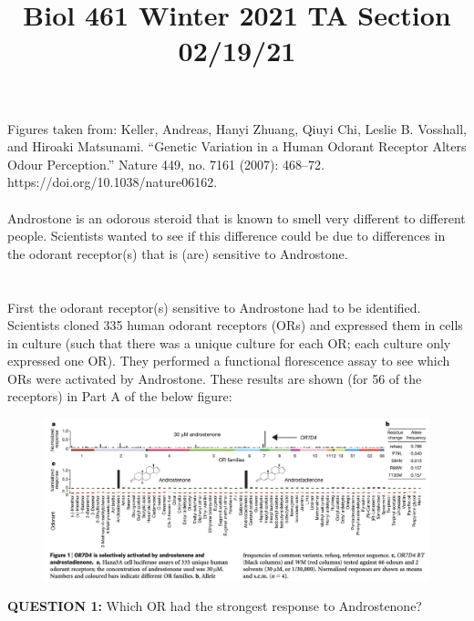\documentclass{article}
\title{Biol 461 Winter 2021 TA Section 02/19/21}
\author{}
\date{}
\begin{document}
\maketitle
\noindent Figures taken from:
Keller, Andreas, Hanyi Zhuang, Qiuyi Chi, Leslie B. Vosshall, and Hiroaki Matsunami. “Genetic Variation in a Human Odorant Receptor Alters Odour Perception.” Nature 449, no. 7161 (2007): 468–72. \\https://doi.org/10.1038/nature06162.
\\
\\
Androstone is an odorous steroid that is known to smell very different to different people. Scientists wanted to see if this difference could be due to differences in the odorant receptor(s) that is (are) sensitive to Androstone.

\section{}
First the odorant receptor(s) sensitive to Androstone had to be identified. Scientists cloned 335 human odorant receptors (ORs) and expressed them in cells in culture (such that there was a unique culture for each OR; each culture only expressed one OR). They performed a functional florescence assay to see which ORs were activated by Androstone. These results are shown (for 56 of the receptors) in Part A of the below figure:

\begin{figure}[h]
\hspace*{-3cm} 
\includegraphics[scale =.5]{1.1}\\
\end{figure}

\noindent \textbf{QUESTION 1:} Which OR had the strongest response to Androstenone?\\
\\
\\
\end{document}
